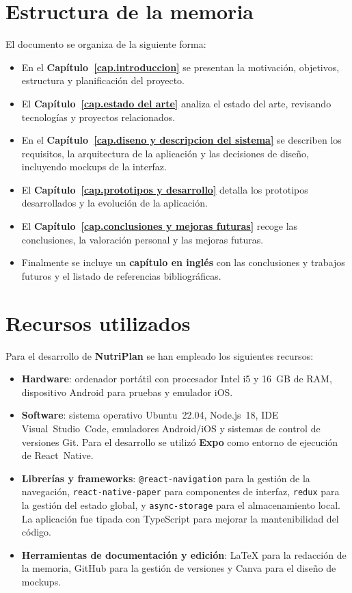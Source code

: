 \documentclass[twoside, openright, 11pt]{report}
\begin{document}
\section{Estructura de la memoria}
El documento se organiza de la siguiente forma:
\begin{itemize}
  \item En el \textbf{Capítulo~\ref{cap.introduccion}} se presentan la motivación, objetivos, estructura y planificación del proyecto.
  \item El \textbf{Capítulo~\ref{cap.estado del arte}} analiza el estado del arte, revisando tecnologías y proyectos relacionados.
  \item En el \textbf{Capítulo~\ref{cap.diseno y descripcion del sistema}} se describen los requisitos, la arquitectura de la aplicación y las decisiones de diseño, incluyendo mockups de la interfaz.
  \item El \textbf{Capítulo~\ref{cap.prototipos y desarrollo}} detalla los prototipos desarrollados y la evolución de la aplicación.
  \item El \textbf{Capítulo~\ref{cap.conclusiones y mejoras futuras}} recoge las conclusiones, la valoración personal y las mejoras futuras.
  \item Finalmente se incluye un \textbf{capítulo en inglés} con las conclusiones y trabajos futuros y el listado de referencias bibliográficas.
\end{itemize}

\section{Recursos utilizados}
Para el desarrollo de \textbf{NutriPlan} se han empleado los siguientes recursos:
\begin{itemize}
  \item \textbf{Hardware}: ordenador portátil con procesador Intel i5 y 16~GB de RAM, dispositivo Android para pruebas y emulador iOS.
  \item \textbf{Software}: sistema operativo Ubuntu~22.04, Node.js~18, IDE Visual Studio Code, emuladores Android/iOS y sistemas de control de versiones Git. Para el desarrollo se utilizó \textbf{Expo} como entorno de ejecución de React Native.
  \item \textbf{Librerías y frameworks}: \verb|@react-navigation| para la gestión de la navegación, \verb|react-native-paper| para componentes de interfaz, \verb|redux| para la gestión del estado global, y \verb|async-storage| para el almacenamiento local. La aplicación fue tipada con TypeScript para mejorar la mantenibilidad del código.
  \item \textbf{Herramientas de documentación y edición}: \LaTeX{} para la redacción de la memoria, GitHub para la gestión de versiones y Canva para el diseño de mockups.
\end{itemize}
\end{document}
